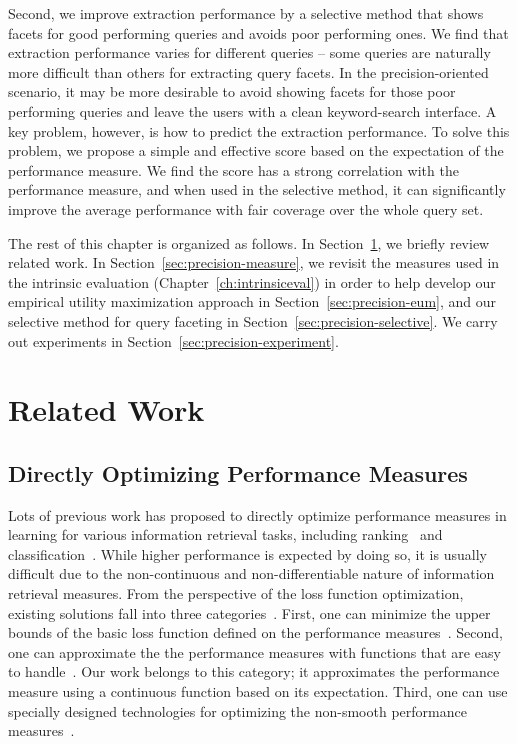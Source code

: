 Second, we improve extraction performance by a selective method that shows facets for good performing queries and avoids poor performing ones. We find that extraction performance varies for different queries -- some queries are naturally more difficult than others for extracting query facets. In the precision-oriented scenario, it may be more desirable to avoid showing facets for those poor performing queries and leave the users with a clean keyword-search interface. A key problem, however, is how to predict the extraction performance. To solve this problem, we propose a simple and effective score based on the expectation of the performance measure. We find the score has a strong correlation with the performance measure, and when used in the selective method, it can significantly improve the average performance with fair coverage over the whole query set.

The rest of this chapter is organized as follows. In Section~\ref{sec:precision-related}, we briefly review related work. In Section~\ref{sec:precision-measure}, we revisit the \PRF measures used in the intrinsic evaluation (Chapter~\ref{ch:intrinsiceval}) in order to help develop our empirical utility maximization approach in Section~\ref{sec:precision-eum}, and our selective method for query faceting in Section~\ref{sec:precision-selective}. We carry out experiments in Section~\ref{sec:precision-experiment}.
\section{Related Work}
\label{sec:precision-related}
\subsection{Directly Optimizing Performance Measures}
Lots of previous work has proposed to directly optimize performance measures in learning for various information retrieval tasks, including ranking~\cite{metzler2005direct,xu2008directly,xu2007adarank,cossock2006subset,quoc2007learning,de2007combined} and classification~\cite{musicant2003optimizing,joachims2005support,jansche2005maximum}. While higher performance is expected by doing so, it is usually difficult due to the non-continuous and non-differentiable nature of information retrieval measures. From the perspective of the loss function optimization, existing solutions fall into three categories~\cite{xu2008directly}. First, one can minimize the upper bounds of the basic loss function defined on the performance measures~\cite{xu2007adarank,joachims2005support,yue2007support}. Second, one can approximate the the performance measures with functions that are easy to handle~\cite{jansche2005maximum,cossock2006subset}. Our work belongs to this category; it approximates the performance measure using a 
continuous function based on 
its expectation. Third, one can use specially designed technologies for optimizing the non-smooth performance measures~\cite{quoc2007learning,de2007combined}. 

